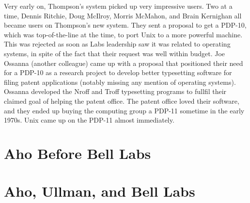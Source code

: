 Very early on, Thompson's system picked up very impressive users.
Two at a time, Dennis Ritchie, Doug McIlroy, Morris McMahon, and Brain Kernighan
all became users on Thompson's new system.
They sent a proposal to get a PDP-10, which was top-of-the-line at the time,
to port Unix to a more powerful machine.
This was rejected as soon as Labs leadership saw it was related to operating systems,
in spite of the fact that their request was well within budget.
Joe Ossanna (another colleague) came up with a proposal that
positioned their need for a PDP-10 as a research project to develop better typesetting
software for filing patent applications (notably missing any mention of operating
systems).
Ossanna developed the Nroff and Troff typesetting programs to fullfil their claimed
goal of helping the patent office.
The patent office loved their software, and they ended up buying the computing group
a PDP-11 sometime in the early 1970s.
Unix came up on the PDP-11 almost immediately.



\section{Aho Before Bell Labs}

\section{Aho, Ullman, and Bell Labs}

